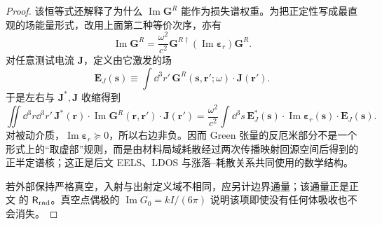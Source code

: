 \begin{proof}
该恒等式还解释了为什么 $\operatorname{Im}\mathbf G^R$ 能作为损失谱权重。为把正定性写成最直观的场能量形式，改用上面第二种等价次序，亦有
\[
\operatorname{Im}\mathbf G^R
=\frac{\omega^2}{c^2}
\mathbf G^{R\dagger}
(\operatorname{Im}\boldsymbol\varepsilon_r)
\mathbf G^R.
\]
对任意测试电流 $\mathbf J$，定义由它激发的场
\[
\mathbf E_J(\mathbf s)
\equiv\int\dd^3r'\,\mathbf G^R(\mathbf s,\mathbf r';\omega)\cdot\mathbf J(\mathbf r').
\]
于是左右与 $\mathbf J^*,\mathbf J$ 收缩得到
\[
\iint\dd^3r\dd^3r'\,
\mathbf J^*(\mathbf r)\cdot\operatorname{Im}\mathbf G^R(\mathbf r,\mathbf r')\cdot\mathbf J(\mathbf r')
=\frac{\omega^2}{c^2}\int\dd^3s\,
\mathbf E_J^*(\mathbf s)\cdot
\operatorname{Im}\boldsymbol\varepsilon_r(\mathbf s)\cdot\mathbf E_J(\mathbf s).
\]
对被动介质，$\operatorname{Im}\boldsymbol\varepsilon_r\succeq0$，所以右边非负。因而 Green 张量的反厄米部分不是一个形式上的“取虚部”规则，而是由材料局域耗散经过两次传播映射回源空间后得到的正半定谱核；这正是后文 EELS、LDOS 与涨落--耗散关系共同使用的数学结构。


若外部保持严格真空，入射与出射定义域不相同，应另计边界通量；该通量正是正文 的 $\mathsf R_{\rm rad}$。真空点偶极的 $\operatorname{Im}G_0=kI/(6\pi)$ 说明该项即使没有任何体吸收也不会消失。
\end{proof}

